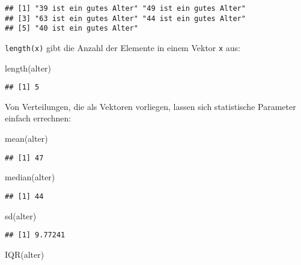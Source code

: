 \documentclass[11pt,german,a4paper]{article}
\newenvironment{Shaded}{\begin{snugshade}}{\end{snugshade}}
\newcommand{\FunctionTok}[1]{\textcolor[rgb]{0.00,0.00,0.00}{#1}}
\newcommand{\NormalTok}[1]{#1}
\begin{document}
\begin{verbatim}
## [1] "39 ist ein gutes Alter" "49 ist ein gutes Alter"
## [3] "63 ist ein gutes Alter" "44 ist ein gutes Alter"
## [5] "40 ist ein gutes Alter"
\end{verbatim}

\texttt{length(x)} gibt die Anzahl der Elemente in einem Vektor \texttt{x} aus:

\begin{Shaded}
\begin{Highlighting}[]
\FunctionTok{length}\NormalTok{(alter)}
\end{Highlighting}
\end{Shaded}

\begin{verbatim}
## [1] 5
\end{verbatim}

Von Verteilungen, die als Vektoren vorliegen, lassen sich statistische Parameter einfach errechnen:

\begin{Shaded}
\begin{Highlighting}[]
\FunctionTok{mean}\NormalTok{(alter)}
\end{Highlighting}
\end{Shaded}

\begin{verbatim}
## [1] 47
\end{verbatim}

\begin{Shaded}
\begin{Highlighting}[]
\FunctionTok{median}\NormalTok{(alter)}
\end{Highlighting}
\end{Shaded}

\begin{verbatim}
## [1] 44
\end{verbatim}

\begin{Shaded}
\begin{Highlighting}[]
\FunctionTok{sd}\NormalTok{(alter)}
\end{Highlighting}
\end{Shaded}

\begin{verbatim}
## [1] 9.77241
\end{verbatim}

\begin{Shaded}
\begin{Highlighting}[]
\FunctionTok{IQR}\NormalTok{(alter)}
\end{Highlighting}
\end{Shaded}
\end{document}
